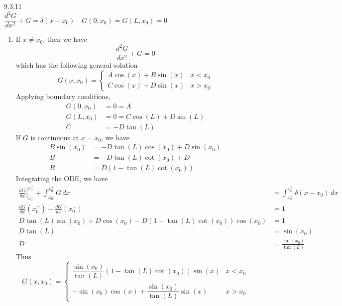 \documentclass{article}
\theoremstyle{definition}
\begin{document}
    \begin{prob}{9.3.11} $ $ \vspace{2mm} \\
        $ \dfrac{d^2 G}{dx^2} + G = \delta(x-x_0) \quad G(0,x_0) = G(L,x_0)=0 $ \\
        \begin{enumerate}[label=\alph*.)]
            \item If $x\neq x_{0}$, then we have
                \[
                    \frac{d^2G}{dx^2} + G = 0
                \]
                which has the following general solution
                \[
                    G(x,x_0) = \begin{cases} A\cos(x) + B\sin(x) &x<x_0 \\ C\cos(x) + D\sin(x) & x>x_0 \end{cases}
                \]
                Applying boundary conditions,
                \begin{align*}
                    G(0,x_0) &= 0 = A \\
                    G(L,x_0) &= 0 = C\cos(L) + D\sin(L) \\
                    C &= -D\tan(L)
                \end{align*}
                If $G$ is continuous at $x=x_{0}$, we have
                \begin{align*}
                    B\sin(x_0) &= -D\tan(L)\cos(x_0) + D\sin(x_0) \\
                             B &= -D\tan(L)\cot(x_0) + D \\
                             B &= D(1-\tan(L)\cot(x_0))
                \end{align*}
                Integrating the ODE, we have
                \begin{align*}
                    \left. \frac{dG}{dx} \right|_{x_0^-}^{x_0^+} + \int_{x_0^-}^{x_0^+} G \, dx &= \int_{x_0^-}^{x_0^+} \delta(x-x_0) \, dx \\
                    \frac{dG}{dx}(x_0^+) - \frac{dG}{dx}(x_0^-) &= 1 \\
                    D\tan(L)\sin(x_0) + D\cos(x_0) - D(1-\tan(L)\cot(x_0))\cos(x_0) &= 1 \\
                    D\tan(L) &= \sin(x_0) \\
                    D &= \frac{\sin(x_0)}{\tan(L)}
                \end{align*}
                Thus 
                \[
                    \boxed{ G(x,x_0) = \begin{cases} \dfrac{\sin(x_0)}{\tan(L)}(1-\tan(L)\cot(x_0))\sin(x) & x<x_0 \\ -\sin(x_0)\cos(x) + \dfrac{\sin(x_0)}{\tan(L)}\sin(x) &x>x_0 \end{cases} }
\]
\end{enumerate}
\end{prob}
\end{document}
